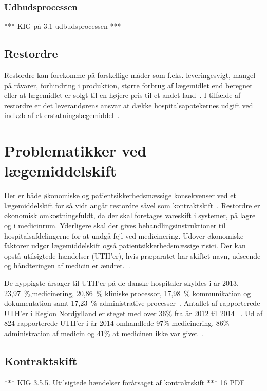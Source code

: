 \subsubsection{Udbudsprocessen}
*** KIG på 3.1 udbudsprocessen  ***

\subsection{Restordre}
Restordre kan forekomme på forskellige måder som f.eks. leveringesvigt, mangel på råvarer, forhindring i produktion, større forbrug af lægemidlet end beregnet eller at lægemidlet er solgt til en højere pris til et andet land~\citep{Amgros2017}. I tilfælde af restordre er det leverandørens ansvar at dække hospitalsapotekernes udgift ved indkøb af et erstatningslægemiddel~.


\section{Problematikker ved lægemiddelskift}
Der er både økonomiske og patientsikkerhedsmæssige konsekvenser ved et lægemiddelskift for så vidt angår restordre såvel som kontraktskift~\citep{Amgros2015}. Restordre er økonomisk omkostningsfuldt, da der skal foretages vareskift i systemer, på lagre og i medicinrum. Yderligere skal der gives behandlingsinstruktioner til hospitalsafdelingerne for at undgå fejl ved medicinering. Udover økonomiske faktorer udgør lægemiddelskift også patientsikkerhedsmæssige risici. Der kan opstå utilsigtede hændelser (UTH'er), hvis præparatet har skiftet navn, udseende og håndteringen af medicin er ændret.~\citep{Amgros2015}. 

De hyppigste årsager til UTH'er på de danske hospitaler skyldes i år 2013, 23,97~\%,medicinering, 20,86~\% kliniske processor, 17,98~\% kommunikation og dokumentation samt 17,23~\% administrative processer~\citep{Patientombuddet2013}. Antallet af rapporterede UTH'er i Region Nordjylland er steget med over 36\% fra år 2012 til 2014 ~\citep{Jensen2014}. Ud af 824 rapporterede UTH'er i år 2014 omhandlede 97\% medicinering, 86\% administration af medicin og 41\% at medicinen ikke var givet~\citep{Jensen2014}. 

\subsection{Kontraktskift}
*** KIG 3.5.5. Utilsigtede hændelser forårsaget af kontraktskift *** 16 PDF


